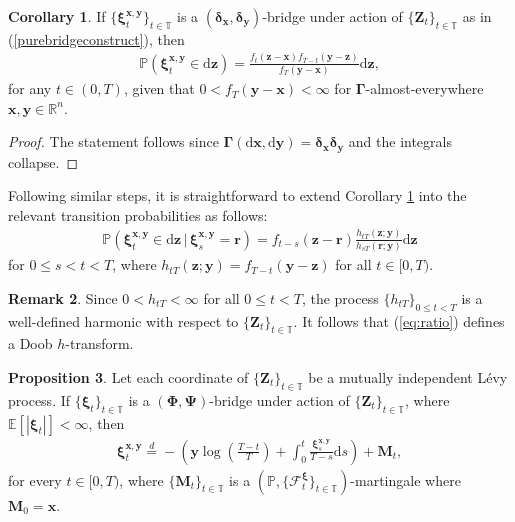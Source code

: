 \documentclass{article}
\newcommand{\levy}{{L\'evy }}
\def\R{\mathbb{R}}
\def\P{\mathbb{P}}
\def\E{\mathbb{E}}
\def\T{\mathbb{T}}
\def\dd{\mathrm{d}}
\def\xib{\boldsymbol{\xi}}
\theoremstyle{definition}
\newtheorem{proposition}{Proposition}[section]
\newtheorem{corollary}[proposition]{Corollary}
\newtheorem{remark}[proposition]{Remark}
\begin{document}
\begin{corollary}
\label{levycorodensity}
If $\{\xib^{\boldsymbol{x},\boldsymbol{y}}_t\}_{t\in\T}$ is a $(\boldsymbol{\delta}_{\boldsymbol{x}},\boldsymbol{\delta}_{\boldsymbol{y}})$-bridge under action of $\{\boldsymbol{Z}_t\}_{t\in\T}$ as in (\ref{purebridgeconstruct}), then
\begin{align}
\mathbb{P}(\xib^{\boldsymbol{x},\boldsymbol{y}}_t \in \dd \boldsymbol{z})= \frac{f_{t}(\boldsymbol{z} - \boldsymbol{x})f_{T-t}(\boldsymbol{y} - \boldsymbol{z})}{f_T(\boldsymbol{y} - \boldsymbol{x})}\dd \boldsymbol{z}, \label{levycorodensityimplicit}
\end{align}
for any $t\in(0,T)$, given that $0 < f_T(\boldsymbol{y}-\boldsymbol{x}) < \infty$ for $\boldsymbol{\Gamma}$-almost-everywhere $\boldsymbol{x},\boldsymbol{y}\in\R^n$.
\end{corollary}
\begin{proof}
The statement follows since $\boldsymbol{\Gamma}(\dd \boldsymbol{x}, \dd \boldsymbol{y}) = \boldsymbol{\delta}_{\boldsymbol{x}}\boldsymbol{\delta}_{\boldsymbol{y}}$ and the integrals collapse.
\end{proof}
Following similar steps, it is straightforward to extend Corollary \ref{levycorodensity} into the relevant transition probabilities as follows:
\begin{align}
\mathbb{P}( \xib^{\boldsymbol{x},\boldsymbol{y}}_t \in \dd \boldsymbol{z} \,|\, \xib^{\boldsymbol{x},\boldsymbol{y}}_s = \boldsymbol{r}) = f_{t-s}(\boldsymbol{z}-\boldsymbol{r})\frac{h_{tT}(\boldsymbol{z};\boldsymbol{y})}{h_{sT}(\boldsymbol{r};\boldsymbol{y})}\dd \boldsymbol{z} \label{eq:ratio}
\end{align}
for $0\leq s <t <T$, where $h_{tT}(\boldsymbol{z};\boldsymbol{y})=f_{T-t}(\boldsymbol{y}-\boldsymbol{z})$ for all $t\in[0,T)$. 
\begin{remark}
Since $ 0 < h_{tT} < \infty$ for all $0 \leq t < T$, the process $\{h_{tT}\}_{0 \leq t<T}$ is a well-defined harmonic with respect to $\{\mathbf{Z}_{t}\}_{t\in\T}$. It follows that (\ref{eq:ratio}) defines a Doob $h$-transform.
\end{remark}
\begin{proposition}
\label{stochfiltclassicbridge}
Let each coordinate of $\{\mathbf{Z}_t\}_{t\in\T}$ be a mutually independent \levy process. If $\{\xib_t\}_{t\in\T}$ is a $(\boldsymbol{\Phi}, \boldsymbol{\Psi})$-bridge under action of $\{\boldsymbol{Z}_t\}_{t\in\T}$, where $\E[|\xib_t|] < \infty$, then
\begin{align}
\label{classicalbridgenonanticipative}
\xib^{\boldsymbol{x},\boldsymbol{y}}_t \overset{d}{=} -\left(\boldsymbol{y}\log\left(\frac{T-t}{T}\right) + \int_0^t \frac{\xib^{\boldsymbol{x},\boldsymbol{y}}_s }{T-s}\dd s\right) + \mathbf{M}_t,
\end{align}
for every $t\in[0,T)$, where $\{\mathbf{M}_t\}_{t\in\T}$ is a $(\P,\{\mathcal{F}_{t}^{\xib}\}_{t\in\T})$-martingale where $\mathbf{M}_{0} = \boldsymbol{x}$.
\end{proposition}
\end{document}
